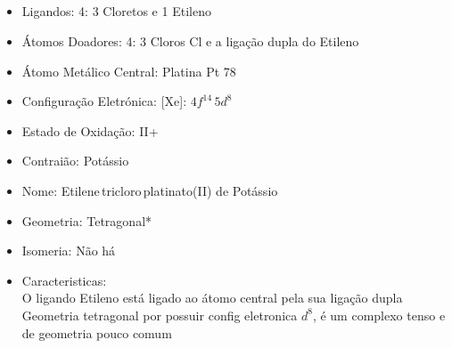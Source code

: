 \documentclass[12pt]{article}
\begin{document}
	\subsection{}
	\begin{itemize}
   
   
   \item Ligandos: 4: 3 Cloretos  e 1 Etileno 
   
   
   \item Átomos Doadores: 4: 3 Cloros Cl e a ligação dupla do Etileno
   
   \item Átomo Metálico Central: Platina Pt 78
   
   \item Configuração Eletrónica:
   	[Xe]: $ 4f^{14}\,5d^8 $
   
   \item Estado de Oxidação: II+
   
   \item Contraião: Potássio 
   
   \item Nome: Etilene\,tricloro\,platinato(II) de Potássio
   
   \item Geometria: Tetragonal*
   
   \item Isomeria: Não há

	\item Caracteristicas:\\
		O ligando Etileno está ligado ao átomo central pela sua ligação dupla\\
		Geometria tetragonal por possuir config eletronica $d^8$, é um complexo tenso e de geometria pouco comum

	\end{itemize}
	
\break


	
\end{document}
